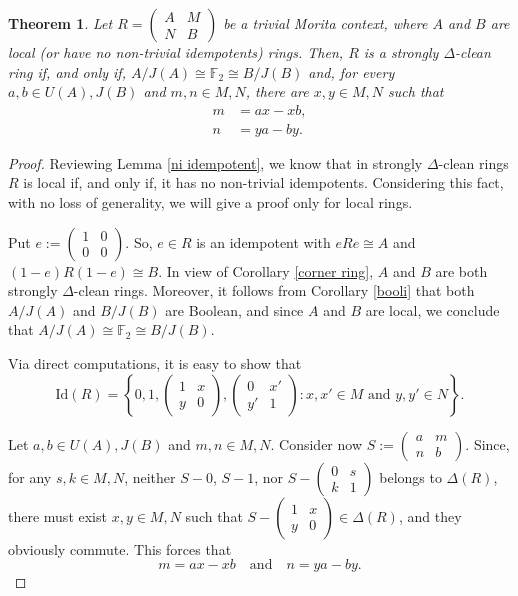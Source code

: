 \documentclass[12pt]{amsart}
\newtheorem{theorem}{Theorem}[section]
\theoremstyle{definition}
\begin{document}
\begin{theorem}\label{loc mori}
Let $R = \begin{pmatrix}
A & M \\
N & B
\end{pmatrix}$ be a trivial Morita context, where $A$ and $B$ are local (or have no non-trivial idempotents) rings. Then, $R$ is a strongly $\Delta$-clean ring if, and only if, $A/J(A) \cong  \mathbb{F}_2 \cong B/J(B)$ and, for every $a,b \in U(A),J(B)$ and $m,n \in M,N$, there are $x,y \in M,N$ such that
\begin{align*}
m &= ax - xb, \\
n &= ya - by.
\end{align*}
\end{theorem}

\begin{proof}
Reviewing Lemma \ref{ni idempotent}, we know that in strongly $\Delta$-clean rings $R$ is local if, and only if, it has no non-trivial idempotents. Considering this fact, with no loss of generality, we will give a proof only for local rings.

Put $e :=\begin{pmatrix}
1 & 0 \\
0 & 0
\end{pmatrix}$. So, $e \in R$ is an idempotent with $eRe \cong A$ and $(1-e)R(1-e) \cong B$. In view of Corollary \ref{corner ring}, $A$ and $B$ are both strongly $\Delta$-clean rings. Moreover, it follows from Corollary \ref{booli} that both $A/J(A)$ and $B/J(B)$ are Boolean, and since $A$ and $B$ are local, we conclude that $A/J(A) \cong  \mathbb{F}_2  \cong B/J(B)$.

Via direct computations, it is easy to show that
\[
\text{Id}(R) = \left\{0,1, \begin{pmatrix}
1 & x \\
y & 0
\end{pmatrix},
\begin{pmatrix}
0 & x' \\
y' & 1
\end{pmatrix} : x,x' \in M \text{ and } y,y' \in N\right\}.
\]

Let $a,b \in U(A),J(B)$ and $m,n \in M,N$. Consider now $S :=\begin{pmatrix}
a & m \\
n & b
\end{pmatrix}$. Since, for any $s,k \in M,N$, neither $S-0$, $S-1$, nor $S-\begin{pmatrix}
0 & s \\
k & 1
\end{pmatrix}$ belongs to $\Delta(R)$, there must exist $x,y \in M,N$ such that $S-\begin{pmatrix}
1 & x \\
y & 0
\end{pmatrix} \in \Delta(R)$, and they obviously commute. This forces that
\[
m = ax - xb \quad \text{and} \quad n = ya - by.
\]


\end{proof}
\end{document}
